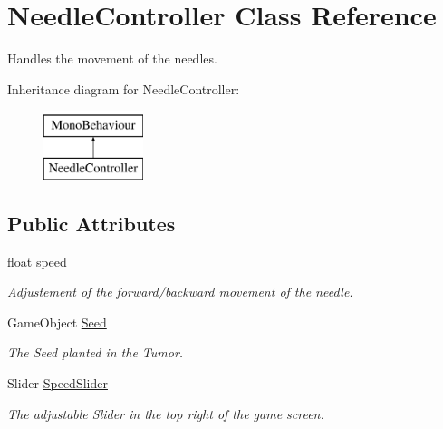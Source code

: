 \hypertarget{class_needle_controller}{}\section{Needle\+Controller Class Reference}
\label{class_needle_controller}


Handles the movement of the needles.  


Inheritance diagram for Needle\+Controller\+:\begin{figure}[H]
\begin{center}
\leavevmode
\includegraphics[height=2.000000cm]{class_needle_controller}
\end{center}
\end{figure}
\subsection*{Public Attributes}
\begin{DoxyCompactItemize}
\item 
\mbox{\label{class_needle_controller_a34e6c905f03f3bb0afb22a60ca868913}} 
float \mbox{\hyperlink{class_needle_controller_a34e6c905f03f3bb0afb22a60ca868913}{speed}}
\begin{DoxyCompactList}\small\item\em Adjustement of the forward/backward movement of the needle. \end{DoxyCompactList}\item 
\mbox{\label{class_needle_controller_a095ef158c2feb66537428d385bcddebc}} 
Game\+Object \mbox{\hyperlink{class_needle_controller_a095ef158c2feb66537428d385bcddebc}{Seed}}
\begin{DoxyCompactList}\small\item\em The Seed planted in the Tumor. \end{DoxyCompactList}\item 
\mbox{\label{class_needle_controller_a8a35d1e5d95210f8be9a00fe9437ae0b}} 
Slider \mbox{\hyperlink{class_needle_controller_a8a35d1e5d95210f8be9a00fe9437ae0b}{Speed\+Slider}}
\begin{DoxyCompactList}\small\item\em The adjustable Slider in the top right of the game screen. \end{DoxyCompactList}\end{DoxyCompactItemize}
